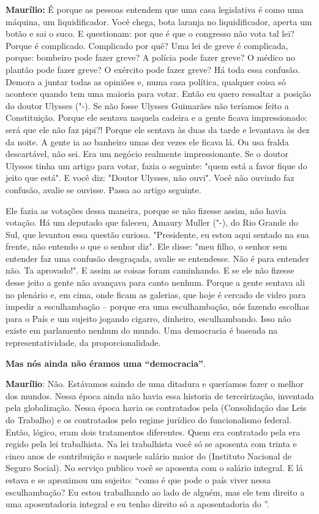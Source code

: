 \textbf{Maurílio:} É porque as pessoas entendem que uma casa legislativa
é como uma máquina, um liquidificador. Você chega, bota laranja no
liquidificador, aperta um botão e sai o suco. E questionam: por que é
que o congresso não vota tal lei? Porque é complicado. Complicado por
quê? Uma lei de greve é complicada, porque: bombeiro pode fazer greve? A
polícia pode fazer greve? O médico no plantão pode fazer greve? O
exército pode fazer greve? Há toda essa confusão. Demora a juntar todas
as opiniões e, numa casa política, qualquer coisa só acontece quando tem
uma maioria para votar. Então eu quero ressaltar a posição do doutor
Ulysses ("-). Se não fosse Ulysses Guimarães não teríamos feito a
Constituição. Porque ele sentava naquela cadeira e a gente ficava
impressionado: será que ele não faz pipi?! Porque ele sentava às duas da
tarde e levantava às dez da noite. A gente ia ao banheiro umas dez vezes
ele ficava lá. Ou usa fralda descartável, não sei. Era um negócio
realmente impressionante. Se o doutor Ulysses tinha um artigo para
votar, fazia o seguinte: "quem está a favor fique do jeito que está". E
você diz: "Doutor Ulysses, não ouvi". Você não ouvindo faz confusão,
avalie se ouvisse. Passa ao artigo seguinte.

Ele fazia as votações dessa maneira, porque se não fizesse assim, não
havia votação. Há um deputado que faleceu, Amaury Muller ("-), do
Rio Grande do Sul, que levantou essa questão curiosa. "Presidente, eu
estou aqui sentado na sua frente, não entendo o que o senhor diz". Ele
disse: "meu filho, o senhor sem entender faz uma confusão desgraçada,
avalie se entendesse. Não é para entender não. Ta aprovado!". E assim as
coisas foram caminhando. E se ele não fizesse desse jeito a gente não
avançava para canto nenhum. Porque a gente sentava ali no plenário e, em
cima, onde ficam as galerias, que hoje é cercado de vidro para impedir a
esculhambação -- porque era uma esculhambação, nós fazendo escolhas para
o País e um sujeito jogando cigarro, dinheiro, esculhambando. Isso não
existe em parlamento nenhum do mundo. Uma democracia é baseada na
representatividade, da proporcionalidade.

\textbf{Mas nós ainda não éramos uma ``democracia''}.

\textbf{Maurílio}: Não. Estávamos saindo de uma ditadura e queríamos
fazer o melhor dos mundos. Nessa época ainda não havia essa historia de
terceirização, inventada pela globalização. Nessa época havia os
contratados pela  (Consolidação das Leis do Trabalho) e os
contratados pelo regime jurídico do funcionalismo federal. Então,
lógico, eram dois tratamentos diferentes. Quem era contratado pela 
era regido pela lei trabalhista. Na lei trabalhista você só se aposenta
com trinta e cinco anos de contribuição e naquele salário maior do 
(Instituto Nacional de Seguro Social). No serviço publico você se
aposenta com o salário integral. E lá estava e se aproximou um sujeito:
``como é que pode o país viver nessa esculhambação? Eu estou trabalhando
ao lado de alguém, mas ele tem direito a uma aposentadoria integral e eu
tenho direito só a aposentadoria do ''.


